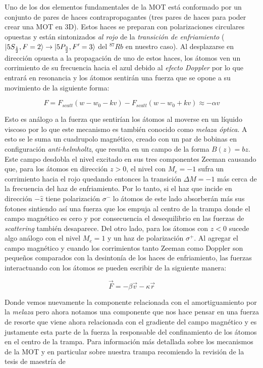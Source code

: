 \documentclass[12pt,twoside]{article}
\begin{document}
Uno de los dos elementos fundamentales de la MOT está conformado por un conjunto de pares de haces contrapropagantes (tres pares de haces para poder crear una MOT en 3D). Estos haces se preparan con polarizaciones circulares opuestas y están sintonizados \textit{al rojo} de la \textit{transición de enfriamiento} ( $\ket{5S_{\frac{1}{2}},F=2} \rightarrow \ket{5P_{\frac{3}{2}},F'=3}$ del $^{87}Rb$ en nuestro caso). Al desplazarse en dirección opuesta a la propagación de uno de estos haces, los átomos ven un corrimiento de su frecuencia hacia el azul debido al \textit{efecto Doppler} por lo que entrará en resonancia y los átomos sentirán una fuerza que se opone a su movimiento de la siguiente forma\cite{Foot}:


\begin{equation}
F = F_{scatt}(w-w_0-kv) - F_{scatt}(w-w_0+kv)  \approx - \alpha v
\end{equation}

Esto es análogo a la fuerza que sentirían los átomos al moverse en un líquido viscoso por lo que este mecanismo es también conocido como \textit{melaza óptica}. A esto se le suma un cuadrupolo magnético, creado con un par de bobinas en configuración \textit{anti-helmholtz}, que resulta en un campo de la forma $B(z) = bz$.   
Este campo desdobla el nivel excitado en sus tres componentes Zeeman causando que, para los átomos en dirección $z > 0$, el nivel con $M_e = -1$ sufra un corrimiento hacia el rojo quedando entonces la transición $\Delta M = -1$ más cerca de la frecuencia del haz de enfriamiento. Por lo tanto, si el haz que incide en dirección $-\hat{z}$ tiene polarización $\sigma^{-}$ lo átomos de este lado absorberán más sus fotones sintiendo así una fuerza que los empuja al centro de la trampa donde el campo magnético es cero y por consecuencia el desequilibrio en las fuerzas de \textit{scattering} también desaparece. Del otro lado, para los átomos con $z < 0$ sucede algo análogo con el nivel $M_e = 1$ y un haz de polarización $\sigma^{+}$. Al agregar el campo magnético y cuando los corrimientos tanto Zeeman como Doppler son pequeños comparados con la desintonía de los haces de enfriamiento, las fuerzas interactuando con los átomos se pueden escribir de la siguiente manera\cite{metcalf99}: 

\begin{equation}
\vec{F} = -\beta \vec{v} - \kappa  \vec{r}
\end{equation}

Donde vemos nuevamente la componente relacionada con el amortiguamiento por la \textit{melaza} pero ahora notamos una componente que nos hace pensar en una fuerza de resorte que viene ahora relacionada con el gradiente del campo magnético y es justamente esta parte de la fuerza la responsable del confinamiento de los átomos en el centro de la trampa. 
Para información más detallada sobre los mecanismos de la MOT y en particular sobre nuestra trampa recomiendo la revisión de la tesis de maestría de 
\end{document}
